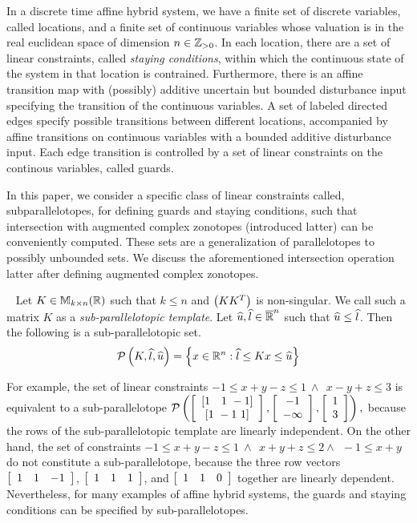 
In a discrete time affine hybrid system, we have a finite set of
discrete variables, called locations, and a finite set of continuous
variables whose valuation is in the real euclidean space of dimension
$n\in\mathbb{Z}_{> 0}$.  In each location, there are a set of linear constraints,
called \emph{staying conditions}, within which the continuous state of
the system in that location is contrained.  Furthermore, there is
an affine transition map with (possibly) additive uncertain but
bounded disturbance input specifying the transition of the continuous
variables.  A set of labeled directed edges specify possible
transitions between different locations, accompanied by affine
transitions on continuous variables with a bounded additive
disturbance input.  Each edge transition is controlled by a set of
linear constraints on the continous variables, called guards.

In this paper, we consider a specific class of linear constraints
called, subparallelotopes, for defining guards and staying conditions,
such that intersection with augmented complex zonotopes (introduced
latter) can be conveniently computed.  These sets are a
generalization of parallelotopes to possibly unbounded sets.  We
discuss the aforementioned intersection operation latter after
defining augmented complex zonotopes.
%
\begin{definition}~\label{defn:sub-parallelotope} Let
  $K\in\mathbb{M}_{k\times n}(\mathbb{R})$ such that $k\leq n$ and $\left(KK^T\right)$ is
  non-singular.  We call such a matrix $K$ as a
  \emph{sub-parallelotopic template}.  Let
  $\widehat{u},\widehat{l}\in\mathbb{\overline{R}}^n$ such that $\widehat{u}\leq\widehat{l}$.  Then
  the following is a sub-parallelotopic set.
\[
\mathcal{P}\left(K,\widehat{l},\widehat{u}\right) = \left\{x\in\mathbb{R}^n: \widehat{l}\leq Kx \leq \widehat{u}\right\}
\]
\end{definition}
%
For example, the set of linear constraints $-1\leq x+y-z\leq
1~\wedge~~ x-y+z\leq 3$ is equivalent to a sub-parallelotope
$\mathcal{P}\left(\left[\begin{array}{c}{\left[1~~~1~-1\right]}\\{\left[1~-1~1\right]} \end{array}\right],\left[\begin{array}{c}{-1}\\{-\infty} \end{array}\right],\left[\begin{array}{c}{1}\\{3} \end{array}\right]\right),$
because the rows of the sub-parallelotopic template are linearly
independent.  On the other hand, the set of constraints $-1\leq
x+y-z\leq 1~\wedge~~x+y+z\leq 2\wedge~~-1\leq x+y$ do not constitute a
sub-parallelotope, because the three row vectors $\left[\begin{array}{c
c c}1 & 1 & -1\end{array}\right]$, $\left[\begin{array}{c c c}1 & 1 &
1\end{array}\right]$, and $\left[\begin{array}{c c c}1 & 1 &
0\end{array}\right]$ together are linearly dependent.  Nevertheless, for
many examples of affine hybrid systems, the guards and staying
conditions can be specified by sub-parallelotopes.


